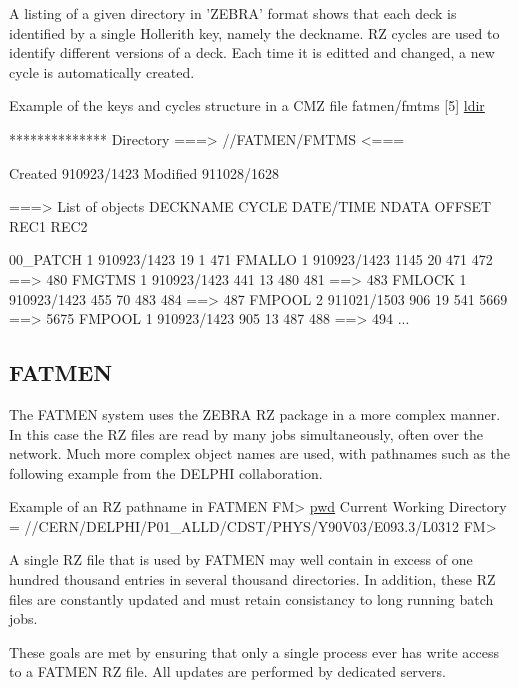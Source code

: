 A listing of a given directory in 'ZEBRA' format shows that each deck
is identified by a single Hollerith key, namely the deckname.
RZ cycles are used to identify different versions of a deck. Each
time it is editted and changed, a new cycle is automatically 
created.

\condbreak{8cm}

\begin{XMPt}{Example of the keys and cycles structure in a CMZ file}
 fatmen/fmtms [5] \underline{ldir}

 ************** Directory ===> //FATMEN/FMTMS <===

                  Created 910923/1423  Modified 911028/1628

 ===> List of objects 
     DECKNAME      CYCLE   DATE/TIME   NDATA OFFSET   REC1    REC2     

     00_PATCH         1   910923/1423     19      1    471    
     FMALLO           1   910923/1423   1145     20    471     472 ==> 480   
     FMGTMS           1   910923/1423    441     13    480     481 ==> 483   
     FMLOCK           1   910923/1423    455     70    483     484 ==> 487   
     FMPOOL           2   911021/1503    906     19    541    5669 ==> 5675   
     FMPOOL           1   910923/1423    905     13    487     488 ==> 494
 ...
\end{XMPt}

\subsection{FATMEN}

The FATMEN system uses the ZEBRA RZ package in a more complex manner.
In this case the RZ files are read by many jobs simultaneously,
often over the network. Much more complex object names are used,
with pathnames such as the following example from the DELPHI 
collaboration. 

\begin{XMPt}{Example of an RZ pathname in FATMEN}
FM> \underline{pwd}
Current Working Directory = //CERN/DELPHI/P01_ALLD/CDST/PHYS/Y90V03/E093.3/L0312
FM>
\end{XMPt}

A single RZ file that is used by FATMEN may well
contain in excess of one hundred thousand 
entries in several thousand directories.
In addition, these RZ files are constantly updated and must
retain consistancy to long running batch jobs.

These goals are met by ensuring that only a single process ever
has write access to a FATMEN RZ file. All updates are performed
by dedicated servers.
